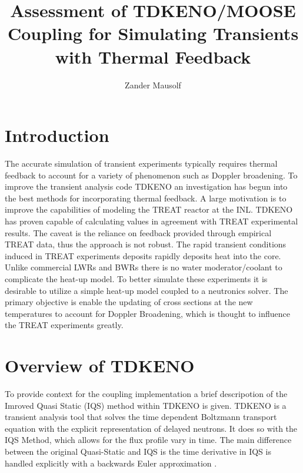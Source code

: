 \documentclass[11pt]{article}
\begin{document}
%
\author{Zander Mausolf}
\title{Assessment of TDKENO/MOOSE Coupling for Simulating Transients with Thermal Feedback}
\maketitle

\section{Introduction}
The accurate simulation of transient experiments typically requires thermal feedback to account for a variety of phenomenon such as Doppler broadening. To improve the transient analysis code TDKENO an investigation has begun into the best methods for incorporating thermal feedback. A large motivation is to improve the capabilities of modeling the TREAT reactor at the INL. TDKENO has proven capable of calculating values in agreement with TREAT experimental results.  The caveat is the reliance on feedback provided through empirical TREAT data, thus the approach is not robust.
The rapid transient conditions induced in TREAT experiments deposits rapidly deposits heat into the core.  Unlike commercial LWRs and BWRs there is no water moderator/coolant to complicate the heat-up model.  To better simulate these experiments it is desirable to utilize a simple heat-up model coupled to a neutronics solver. The primary objective is enable the updating of cross sections at the new temperatures to account for Doppler Broadening, which is thought to influence the TREAT experiments greatly.  

\section{Overview of TDKENO}
To provide context for the coupling implementation a brief descripotion of the Imroved Quasi Static (IQS) method within TDKENO is given.  TDKENO is a transient analysis tool that solves the time dependent Boltzmann transport equation with the explicit representation of delayed neutrons. It does so with the IQS Method, which allows for the flux profile vary in time.  The main difference between the original Quasi-Static and IQS is the time derivative in IQS is handled explicitly with a backwards Euler approximation \cite{goluoglu2001time}. 
\end{document}
